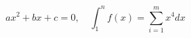 \documentclass{article}
\begin{document}
\[
  ax^2+bx+c=0,\quad
  \int_1^n f(x) = \sum_{i=1}^m x^4 dx
\]
\tagstructend
\tagstructend
\end{document}
